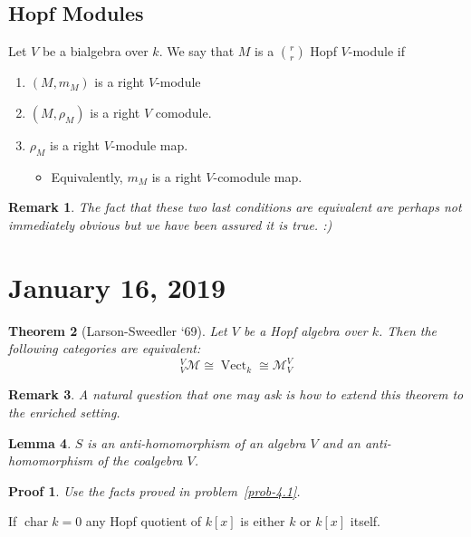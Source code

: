 \documentclass[12pt]{article}
\theoremstyle{break}
\theoremstyle{nonumberbreak}
\theoremstyle{changebreak}
\newtheorem{thm}{Theorem}[subsection]
\newtheorem{lem}[thm]{Lemma}
\theoremstyle{break}
\theoremstyle{nonumberbreak}
\newtheorem{prf}{Proof}
\theoremstyle{nonumberplain}
\theoremstyle{change}
\newtheorem{rmk}[thm]{Remark}
\DeclareMathOperator{\ch}{char}
\newcommand*{\Vectk}{\operatorname{Vect}_k}
\begin{document}
\subsection{Hopf Modules}\label{subsec-hopfmod}
\begin{defn}
	Let $V$ be a bialgebra over $k$. We say that $M$ is a $\binom{r}{r}$ Hopf $V$-module if
	\begin{enumerate}
		\item $(M,m_M)$ is a right $V$-module
		\item $(M,\rho_M)$ is a right $V$ comodule.
		\item $\rho_M$ is a right $V$-module map.
		\begin{itemize}
			\item Equivalently, $m_M$ is a right $V$-comodule map.
		\end{itemize}
	\end{enumerate}
\end{defn}
\begin{rmk}
	The fact that these two last conditions are equivalent are perhaps not immediately obvious but we
	have been assured it is true. :)
\end{rmk}

\section{January 16, 2019}
\begin{thm}[Larson-Sweedler `69]\label{thm-LS69}
	Let $V$ be a Hopf algebra over $k$. Then the following categories are equivalent:
	\[_V^V\mathcal{M}\cong \Vectk\cong \mathcal{M}_V^V\]
\end{thm}

\begin{rmk}
	A natural question that one may ask is how to extend this theorem to the enriched setting.
\end{rmk}

\begin{lem}
	$S$ is an anti-homomorphism of an algebra $V$ and an anti-homomorphism of the coalgebra $V$.
\end{lem}
\begin{prf}
	Use the facts proved in problem~\ref{prob-4.1}.
\end{prf}

\begin{prob}
	If $\ch k=0$ any Hopf quotient of $k[x]$ is either $k$ or $k[x]$ itself.
\end{prob}
\end{document}
